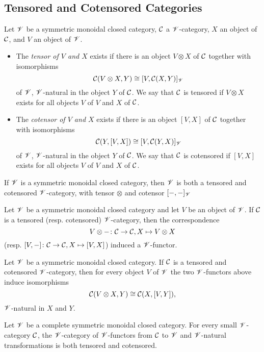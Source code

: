 \documentclass[dissertation.tex]{subfiles}
\begin{document}
\subsection{Tensored and Cotensored Categories}

\begin{defn}
  Let $\mathscr{V}$ be a symmetric monoidal closed category, $\mathcal{C}$ a $\mathscr{V}$-category, $X$ an object of $\mathcal{C}$, and $V$ an object of $\mathscr{V}$.
  \begin{itemize}
  \item
    The {\it tensor of $V$ and $X$} exists if there is an object $V \otimes X$ of $\mathcal{C}$ together with isomorphisms
    $$\mathcal{C}(V \otimes X, Y) \cong [V, \mathcal{C}(X,Y)]_{\mathscr{V}}$$
    of $\mathscr{V}$, $\mathscr{V}$-natural in the object $Y$ of $\mathcal{C}$.
    We say that $\mathcal{C}$ is tensored if $V \otimes X$ exists for all objects $V$ of $V$ and $X$ of $\mathcal{C}$.
  \item
    The {\it cotensor of $V$ and $X$} exists if there is an object $[V,X]$ of $\mathcal{C}$ together with isomorphisms
    $$\mathcal{C}(Y, [V,X]) \cong [V, \mathcal{C}(Y,X)]_{\mathscr{V}}$$
    of $\mathscr{V}$, $\mathscr{V}$-natural in the object $Y$ of $\mathcal{C}$.
    We say that $\mathcal{C}$ is cotensored if $[V,X]$ exists for all objects $V$ of $V$ and $X$ of $\mathcal{C}$.
  \end{itemize}
\end{defn}

\begin{prop}
  If $\mathscr{V}$ is a symmetric monoidal closed category, then $\mathscr{V}$ is both a tensored and cotensored $\mathscr{V}$-category, with tensor $\otimes$ and cotensor $[- , -]_{\mathscr{V}}$
\end{prop}

\begin{prop}
  Let $\mathscr{V}$ be a symmetric monoidal closed category and let $V$ be an object of $\mathscr{V}$.
  If $\mathcal{C}$ is a tensored (resp. cotensored) $\mathscr{V}$-category, then the correspondence
  $$V \otimes - \colon \mathcal{C} \to \mathcal{C}, X \mapsto V \otimes X$$
  (resp. $[V, -] \colon \mathcal{C} \to \mathcal{C}, X \mapsto [V, X]$)
  induced a $\mathscr{V}$-functor.
\end{prop}

\begin{prop}
  Let $\mathscr{V}$ be a symmetric monoidal closed category.
  If $\mathcal{C}$ is a tensored and cotensored $\mathscr{V}$-category, then for every object $V$ of $\mathscr{V}$ the two $\mathscr{V}$-functors above induce isomorphisms
  $$\mathcal{C}(V \otimes X, Y) \cong \mathcal{C}(X, [V,Y]),$$
  $\mathscr{V}$-natural in $X$ and $Y$.
\end{prop}

\begin{prop}\label{modulesaretensored}
  Let $\mathscr{V}$ be a complete symmetric monoidal closed category.
  For every small $\mathscr{V}$-category $\mathcal{C}$, the $\mathscr{V}$-category of $\mathscr{V}$-functors from $\mathcal{C}$ to $\mathscr{V}$ and $\mathscr{V}$-natural transformations is both tensored and cotensored.
\end{prop}
\end{document}
